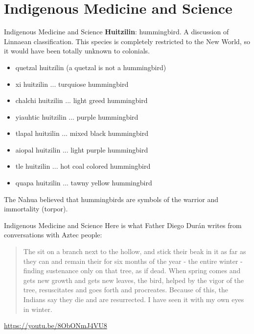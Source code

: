 \documentclass{beamer}
\begin{document}
\section{Indigenous Medicine and Science}

\begin{frame}{Indigenous Medicine and Science}
\small
\textbf{Huitzilin}: hummingbird.  A discussion of Linnaean classification.  This species is completely restricted to the New World, so it would have been totally unknown to colonials.
\begin{itemize}
\item quetzal huitzilin (a quetzal is not a hummingbird)
\item xi huitzilin ... turquiose hummingbird
\item chalchi huitzilin ... light greed hummingbird
\item yiauhtic huitzilin ... purple hummingbird
\item tlapal huitzilin ... mixed black hummingbird
\item aiopal huitzilin ... light purple hummingbird
\item tle huitzilin ... hot coal colored hummingbird
\item quapa huitzilin ... tawny yellow hummingbird
\end{itemize}
The Nahua believed that hummingbirds are symbols of the warrior and immortality (torpor).
\end{frame}

\begin{frame}{Indigenous Medicine and Science}
Here is what Father Diego Dur\'{a}n writes from conversations with Aztec people:
\begin{quote}
The sit on a branch next to the hollow, and stick their beak in it as far as they can and remain their for six months of the year - the entire winter - finding sustenance only on that tree, as if dead.  When spring comes and gets new growth and gets new leaves, the bird, helped by the vigor of the tree, resuscitates and goes forth and procreates. Because of this, the Indians say they die and are resurrected.  I have seen it with my own eyes in winter. 
\end{quote}
\url{https://youtu.be/8ObONmJ4VU8}
\end{frame}
\end{document}
